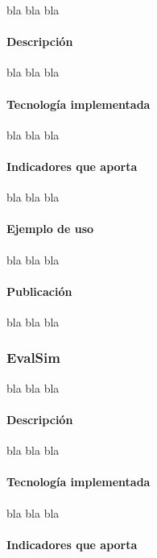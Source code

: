 bla bla bla

\paragraph*{Descripción}

bla bla bla

\paragraph*{Tecnología implementada}

bla bla bla

\paragraph*{Indicadores que aporta}

bla bla bla

\paragraph*{Ejemplo de uso}

bla bla bla

\paragraph*{Publicación}

bla bla bla

\subsubsection{EvalSim}

bla bla bla

\paragraph*{Descripción}

bla bla bla

\paragraph*{Tecnología implementada}

bla bla bla

\paragraph*{Indicadores que aporta}

